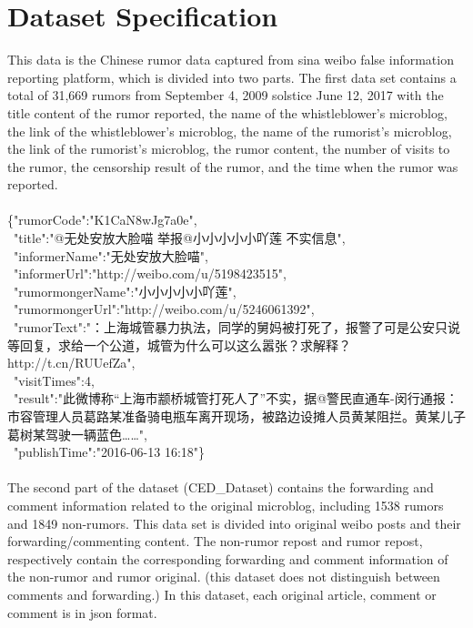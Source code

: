 \documentclass{article}
\begin{document}
\section{Dataset Specification}
This data is the Chinese rumor data captured from sina weibo false information reporting platform, which is divided into two parts. The first data set contains a total of 31,669 rumors from September 4, 2009 solstice June 12, 2017 with the title content of the rumor reported, the name of the whistleblower's microblog, the link of the whistleblower's microblog, the name of the rumorist's microblog, the link of the rumorist's microblog, the rumor content, the number of visits to the rumor, the censorship result of the rumor, and the time when the rumor was reported.
\cite{liu2015rumors}
\\ \hspace*{\fill} \\
\{"rumorCode":"K1CaN8wJg7a0e",\\\ "title":"@无处安放大脸喵 举报@小小小小小吖莲 不实信息",\\\ "informerName":"无处安放大脸喵",\\\ "informerUrl":"http://weibo.com/u/5198423515",\\\ "rumormongerName":"小小小小小吖莲",\\\ "rumormongerUrl":"http://weibo.com/u/5246061392",\\\ "rumorText":"：上海城管暴力执法，同学的舅妈被打死了，报警了可是公安只说等回复，求给一个公道，城管为什么可以这么嚣张？求解释？ http://t.cn/RUUefZa",\\\ "visitTimes":4,\\\ "result":"此微博称“上海市颛桥城管打死人了”不实，据@警民直通车-闵行通报：市容管理人员葛路某准备骑电瓶车离开现场，被路边设摊人员黄某阻拦。黄某儿子葛树某驾驶一辆蓝色……",\\\ "publishTime":"2016-06-13 16:18"\}
\\ \hspace*{\fill} \\
The second part of the dataset (CED\_Dataset) contains the forwarding and comment information related to the original microblog, including 1538 rumors and 1849 non-rumors. This data set is divided into original weibo posts and their forwarding/commenting content. The non-rumor repost and rumor repost, respectively contain the corresponding forwarding and comment information of the non-rumor and rumor original. (this dataset does not distinguish between comments and forwarding.) In this dataset, each original article, comment or comment is in json format.
\cite{song2018ced}
\end{document}
